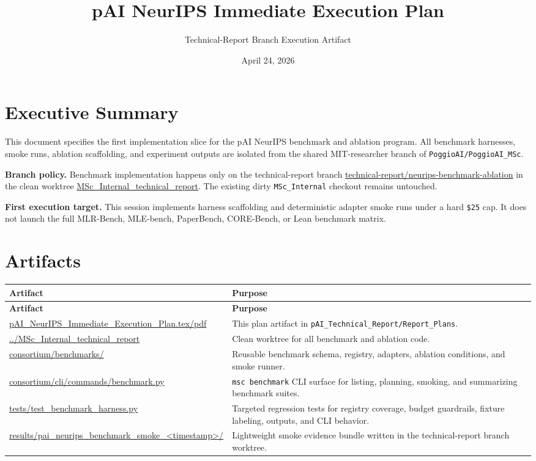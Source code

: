 \documentclass[11pt]{article}
\title{pAI NeurIPS Immediate Execution Plan}
\author{Technical-Report Branch Execution Artifact}
\date{April 24, 2026}
\begin{document}
\maketitle

\section*{Executive Summary}

This document specifies the first implementation slice for the pAI NeurIPS benchmark and ablation program. All benchmark harnesses, smoke runs, ablation scaffolding, and experiment outputs are isolated from the shared MIT-researcher branch of \texttt{PoggioAI/PoggioAI\_MSc}.

\textbf{Branch policy.} Benchmark implementation happens only on the technical-report branch
\url{technical-report/neurips-benchmark-ablation} in the clean worktree
\url{MSc_Internal_technical_report}. The existing dirty \texttt{MSc\_Internal} checkout remains untouched.

\textbf{First execution target.} This session implements harness scaffolding and deterministic adapter smoke runs under a hard \texttt{\$25} cap. It does not launch the full MLR-Bench, MLE-bench, PaperBench, CORE-Bench, or Lean benchmark matrix.

\section*{Artifacts}

\begin{longtable}{>{\raggedright\arraybackslash}p{} >{\raggedright\arraybackslash}p{}}
\toprule
\textbf{Artifact} & \textbf{Purpose} \\
\midrule
\endfirsthead
\toprule
\textbf{Artifact} & \textbf{Purpose} \\
\midrule
\endhead
\url{pAI_NeurIPS_Immediate_Execution_Plan.tex/pdf} & This plan artifact in \texttt{pAI\_Technical\_Report/Report\_Plans}. \\
\url{../MSc_Internal_technical_report} & Clean worktree for all benchmark and ablation code. \\
\url{consortium/benchmarks/} & Reusable benchmark schema, registry, adapters, ablation conditions, and smoke runner. \\
\url{consortium/cli/commands/benchmark.py} & \texttt{msc benchmark} CLI surface for listing, planning, smoking, and summarizing benchmark suites. \\
\url{tests/test_benchmark_harness.py} & Targeted regression tests for registry coverage, budget guardrails, fixture labeling, outputs, and CLI behavior. \\
\url{results/pai_neurips_benchmark_smoke_<timestamp>/} & Lightweight smoke evidence bundle written in the technical-report branch worktree. \\
\bottomrule
\end{longtable}
\end{document}
